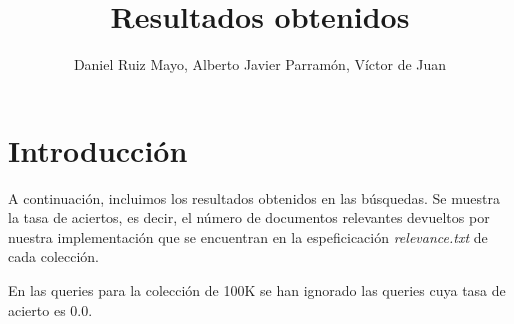 \documentclass[palatino,nochap]{apuntes}
\title{Resultados obtenidos}
\author{Daniel Ruiz Mayo, Alberto Javier Parramón, Víctor de Juan}
\date{}
\begin{document}
\pagestyle{plain}
\maketitle
\section{Introducción}
A continuación, incluimos los resultados obtenidos en las búsquedas. Se muestra la tasa de aciertos, es decir, el número de documentos relevantes devueltos por nuestra implementación que se encuentran en la espeficicación \textit{relevance.txt} de cada colección.

En las queries para la colección de 100K se han ignorado las queries cuya tasa de acierto es 0.0.




\appendix
\end{document}
